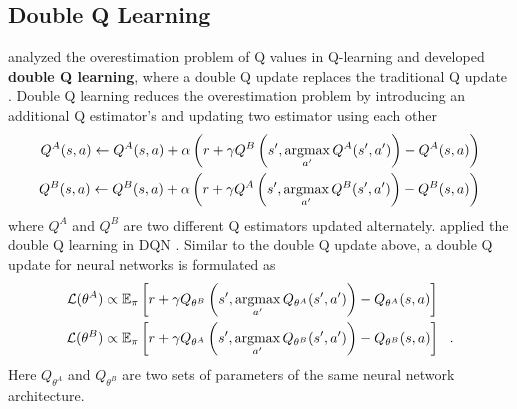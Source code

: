 \subsection{Double Q Learning}
\citeauthor{DoubleQlearning_Hasselt_2010} analyzed the overestimation problem of Q values in Q-learning and developed \textbf{double Q learning}, where a double Q update replaces the traditional Q update \cite{DoubleQlearning_Hasselt_2010}.
Double Q learning reduces the overestimation problem by introducing an additional Q estimator's and updating two estimator using each other
\begin{align*}
    Q^{A}(s, a) \leftarrow Q^{A}(s, a)+ \alpha \left(r+\gamma Q^{B}\left(s', \operatorname*{argmax}_{a'}{Q^A(s', a')}\right)-Q^{A}(s, a)\right)  \\
    Q^{B}(s, a) \leftarrow Q^{B}(s, a)+ \alpha \left(r+\gamma Q^{A}\left(s', \operatorname*{argmax}_{a'}{Q^B(s', a')}\right)-Q^{B}(s, a)\right)
\end{align*}
where $Q^A$ and $Q^B$ are two different Q estimators updated alternately.
\citeauthor{DeepReinforcementLearning_Hasselt.Guez.ea_2016} applied the double Q learning in DQN \cite{DeepReinforcementLearning_Hasselt.Guez.ea_2016}.
Similar to the double Q update above, a double Q update for neural networks is formulated as
\begin{align*}
    \mathcal{L}(\theta^A)  & \propto \mathbb{E}_\pi \left[ r + \gamma Q_{\theta^B}\left(s', \operatorname*{argmax}_{a'}{Q_{\theta^A}(s', a')} \right) - Q_{\theta^A}(s, a) \right]  \\
    \mathcal{L}(\theta^B)  & \propto \mathbb{E}_\pi \left[ r + \gamma Q_{\theta^A}\left(s', \operatorname*{argmax}_{a'}{Q_{\theta^B}(s', a')} \right) - Q_{\theta^B}(s, a) \right] ~~ .
\end{align*}
Here $Q_{\theta^A}$ and $Q_{\theta^B}$ are two sets of parameters of the same neural network architecture.

